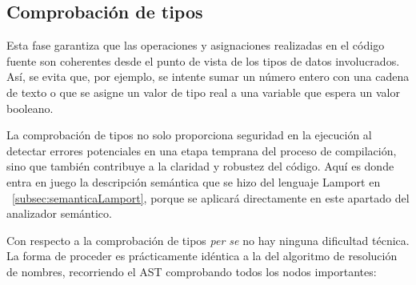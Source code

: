 \subsection{Comprobación de tipos}
Esta fase garantiza que las operaciones y asignaciones realizadas en el código fuente son coherentes desde el punto de vista de los tipos de datos involucrados. Así, se evita que, por ejemplo, se intente sumar un número entero con una cadena de texto o que se asigne un valor de tipo real a una variable que espera un valor booleano.



La comprobación de tipos no solo proporciona seguridad en la ejecución al detectar errores potenciales en una etapa temprana del proceso de compilación, sino que también contribuye a la claridad y robustez del código. Aquí es donde entra en juego la descripción semántica que se hizo del lenguaje Lamport en ~\ref{subsec:semanticaLamport}, porque se aplicará directamente en este apartado del analizador semántico.



Con respecto a la comprobación de tipos \textit{per se} no hay ninguna dificultad técnica. La forma de proceder es prácticamente idéntica a la del algoritmo de resolución de nombres, recorriendo el AST comprobando todos los nodos importantes:

